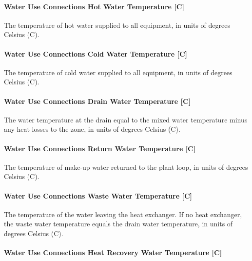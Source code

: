\paragraph{Water Use Connections Hot Water Temperature {[}C{]}}\label{water-use-connections-hot-water-temperature-c}

The temperature of hot water supplied to all equipment, in units of degrees Celsius (C).

\paragraph{Water Use Connections Cold Water Temperature {[}C{]}}\label{water-use-connections-cold-water-temperature-c}

The temperature of cold water supplied to all equipment, in units of degrees Celsius (C).

\paragraph{Water Use Connections Drain Water Temperature {[}C{]}}\label{water-use-connections-drain-water-temperature-c}

The water temperature at the drain equal to the mixed water temperature minus any heat losses to the zone, in units of degrees Celsius (C).

\paragraph{Water Use Connections Return Water Temperature {[}C{]}}\label{water-use-connections-return-water-temperature-c}

The temperature of make-up water returned to the plant loop, in units of degrees Celsius (C).

\paragraph{Water Use Connections Waste Water Temperature {[}C{]}}\label{water-use-connections-waste-water-temperature-c}

The temperature of the water leaving the heat exchanger. If no heat exchanger, the waste water temperature equals the drain water temperature, in units of degrees Celsius (C).

\paragraph{Water Use Connections Heat Recovery Water Temperature {[}C{]}}\label{water-use-connections-heat-recovery-water-temperature-c}


